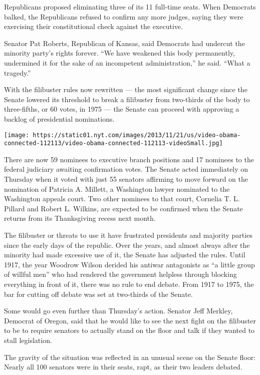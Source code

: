 Republicans proposed eliminating three of its 11 full-time seats. When
Democrats balked, the Republicans refused to confirm any more judges,
saying they were exercising their constitutional check against the
executive.

Senator Pat Roberts, Republican of Kansas, said Democrats had undercut
the minority party's rights forever. ``We have weakened this body
permanently, undermined it for the sake of an incompetent
administration,'' he said. ``What a tragedy.''

With the filibuster rules now rewritten --- the most significant change
since the Senate lowered its threshold to break a filibuster from
two-thirds of the body to three-fifths, or 60 votes, in 1975 --- the
Senate can proceed with approving a backlog of presidential nominations.

\texttt{[image: https://static01.nyt.com/images/2013/11/21/us/video-obama-connected-112113/video-obama-connected-112113-videoSmall.jpg]}

There are now 59 nominees to executive branch positions and 17 nominees
to the federal judiciary awaiting confirmation votes. The Senate acted
immediately on Thursday when it voted with just 55 senators affirming to
move forward on the nomination of Patricia A. Millett, a Washington
lawyer nominated to the Washington appeals court. Two other nominees to
that court, Cornelia T. L. Pillard and Robert L. Wilkins, are expected
to be confirmed when the Senate returns from its Thanksgiving recess
next month.

The filibuster or threats to use it have frustrated presidents and
majority parties since the early days of the republic. Over the years,
and almost always after the minority had made excessive use of it, the
Senate has adjusted the rules. Until 1917, the year Woodrow Wilson
derided his antiwar antagonists as ``a little group of willful men'' who
had rendered the government helpless through blocking everything in
front of it, there was no rule to end debate. From 1917 to 1975, the bar
for cutting off debate was set at two-thirds of the Senate.

Some would go even further than Thursday's action. Senator Jeff Merkley,
Democrat of Oregon, said that he would like to see the next fight on the
filibuster to be to require senators to actually stand on the floor and
talk if they wanted to stall legislation.

The gravity of the situation was reflected in an unusual scene on the
Senate floor: Nearly all 100 senators were in their seats, rapt, as
their two leaders debated.

